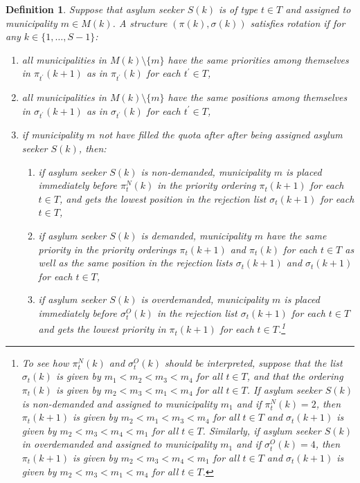 \documentclass[12pt,fleqn]{article}
\newtheorem{definition}{Definition}
\begin{document}
\begin{definition}\rm\label{DEF:Rotation}
Suppose that asylum seeker $S(k)$ is of type $t\in T$ and assigned to municipality $m\in M(k)$. A structure $(\pi(k),\sigma(k))$ satisfies rotation if for any $k\in\{1,\ldots,S-1\}$:
\begin{enumerate}
\item[(i)] all municipalities in $M(k)\setminus \{m\}$ have the same priorities among themselves in $\pi_{t^\prime}(k+1)$ as in $\pi_{t^\prime}(k)$  for each $t^\prime\in T$,

\item[(ii)] all municipalities in $M(k)\setminus \{m\}$ have the same positions among themselves in $\sigma_{t^\prime}(k+1)$ as in $\sigma_{t^\prime}(k)$ for each $t^\prime\in T$,

\item[(iii)] if municipality $m$ not have filled the quota after after being assigned asylum seeker $S(k)$, then:
\begin{enumerate}
\item[(a)] if asylum seeker $S(k)$ is non-demanded, municipality $m$ is placed immediately before $\pi^{N}_t(k)$ in the priority ordering $\pi_t(k+1)$ for each $t\in T$, and gets the lowest position in the rejection list $\sigma_t(k+1)$ for each $t\in T$,
\item[(b)] if asylum seeker $S(k)$ is demanded, municipality $m$ have the same priority in the priority orderings $\pi_t(k+1)$ and $\pi_t(k)$ for each $t\in T$ as well as the same position in the rejection lists $\sigma_t(k+1)$ and $\sigma_t(k+1)$ for each $t\in T$,
\item[(c)]  if asylum seeker $S(k)$ is overdemanded, municipality $m$ is placed immediately before $\sigma^{O}_t(k)$ in the rejection list $\sigma_t(k+1)$ for each $t\in T$ and gets the lowest priority in $\pi_t(k+1)$ for each $t\in T$.\footnote{To see how $\pi^{N}_t(k)$ and $\sigma^{O}_t(k)$ should be interpreted, suppose that the list $\sigma_t(k)$ is given by $m_1<m_2<m_3<m_4$ for all $t\in T$, and that the ordering $\pi_t(k)$ is given by $m_2<m_3<m_1<m_4$ for all $t\in T$. If asylum seeker $S(k)$ is non-demanded and assigned to municipality $m_1$ and if $\pi^{N}_t(k)=2$, then $\pi_t(k+1)$ is given by $m_2<m_1<m_3<m_4$ for all $t\in T$ and $\sigma_t(k+1)$ is given by $m_2<m_3<m_4<m_1$ for all $t\in T$. Similarly, if asylum seeker $S(k)$ in overdemanded and assigned to municipality $m_1$ and if $\sigma^{O}_t(k)=4$, then $\pi_t(k+1)$ is given by $m_2<m_3<m_4<m_1$ for all $t\in T$ and $\sigma_t(k+1)$ is given by $m_2<m_3<m_1<m_4$ for all $t\in T$.}
\end{enumerate}
\end{enumerate}
\end{definition}
\end{document}
